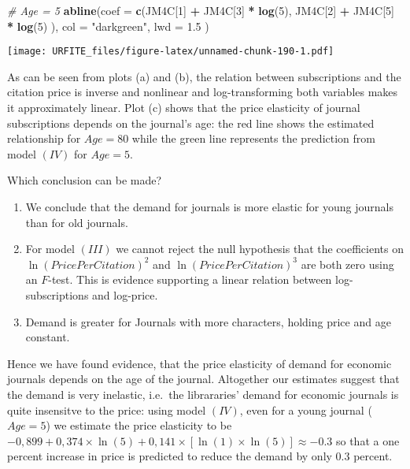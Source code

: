 \documentclass[]{book}
\newenvironment{Shaded}{\begin{snugshade}}{\end{snugshade}}
\newcommand{\KeywordTok}[1]{\textcolor[rgb]{0.13,0.29,0.53}{\textbf{#1}}}
\newcommand{\DataTypeTok}[1]{\textcolor[rgb]{0.13,0.29,0.53}{#1}}
\newcommand{\DecValTok}[1]{\textcolor[rgb]{0.00,0.00,0.81}{#1}}
\newcommand{\FloatTok}[1]{\textcolor[rgb]{0.00,0.00,0.81}{#1}}
\newcommand{\StringTok}[1]{\textcolor[rgb]{0.31,0.60,0.02}{#1}}
\newcommand{\CommentTok}[1]{\textcolor[rgb]{0.56,0.35,0.01}{\textit{#1}}}
\newcommand{\OperatorTok}[1]{\textcolor[rgb]{0.81,0.36,0.00}{\textbf{#1}}}
\newcommand{\NormalTok}[1]{#1}
\theoremstyle{definition}
\theoremstyle{definition}
\theoremstyle{definition}
\theoremstyle{remark}
\begin{document}
\begin{Shaded}
\begin{Highlighting}[]
\CommentTok{# Age = 5}
\KeywordTok{abline}\NormalTok{(}\DataTypeTok{coef =} \KeywordTok{c}\NormalTok{(JM4C[}\DecValTok{1}\NormalTok{] }\OperatorTok{+}\StringTok{ }\NormalTok{JM4C[}\DecValTok{3}\NormalTok{] }\OperatorTok{*}\StringTok{ }\KeywordTok{log}\NormalTok{(}\DecValTok{5}\NormalTok{), }
\NormalTok{                JM4C[}\DecValTok{2}\NormalTok{] }\OperatorTok{+}\StringTok{ }\NormalTok{JM4C[}\DecValTok{5}\NormalTok{] }\OperatorTok{*}\StringTok{ }\KeywordTok{log}\NormalTok{(}\DecValTok{5}\NormalTok{)}
\NormalTok{                ),}
       \DataTypeTok{col =} \StringTok{"darkgreen"}\NormalTok{,}
       \DataTypeTok{lwd =} \FloatTok{1.5}
\NormalTok{)}
\end{Highlighting}
\end{Shaded}

\texttt{[image: URFITE\_files/figure-latex/unnamed-chunk-190-1.pdf]}

As can be seen from plots (a) and (b), the relation between
subscriptions and the citation price is inverse and nonlinear and
log-transforming both variables makes it approximately linear. Plot (c)
shows that the price elasticity of journal subscriptions depends on the
journal's age: the red line shows the estimated relationship for
\(Age=80\) while the green line represents the prediction from model
\((IV)\) for \(Age=5\).

Which conclusion can be made?

\begin{enumerate}
\def\labelenumi{\arabic{enumi}.}
\item
  We conclude that the demand for journals is more elastic for young
  journals than for old journals.
\item
  For model \((III)\) we cannot reject the null hypothesis that the
  coefficients on \(\ln(PricePerCitation)^2\) and
  \(\ln(PricePerCitation)^3\) are both zero using an \(F\)-test. This is
  evidence supporting a linear relation between log-subscriptions and
  log-price.
\item
  Demand is greater for Journals with more characters, holding price and
  age constant.
\end{enumerate}

Hence we have found evidence, that the price elasticity of demand for
economic journals depends on the age of the journal. Altogether our
estimates suggest that the demand is very inelastic, i.e.~the
librararies' demand for economic journals is quite insensitve to the
price: using model \((IV)\), even for a young journal (\(Age=5\)) we
estimate the price elasticity to be
\(-0,899+0,374\times\ln(5)+0,141\times\left[\ln(1)\times\ln(5)\right] \approx -0.3\)
so that a one percent increase in price is predicted to reduce the
demand by only \(0.3\) percent.
\end{document}
